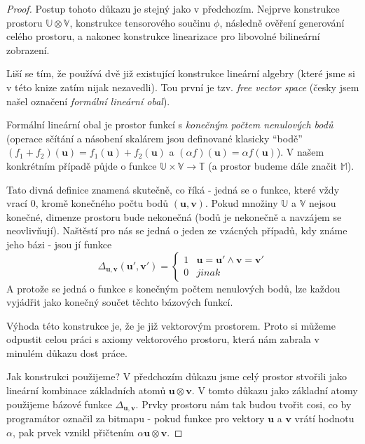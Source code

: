 \documentclass[a5paper,12pt]{amsbook}
\theoremstyle{definition}
\newcommand{\myvec}[1]{\bm{#1}}
\newcommand{\myspace}[1]{\mathbb{#1}}
\begin{document}
\begin{proof}
Postup tohoto důkazu je stejný jako v předchozím. Nejprve konstrukce prostoru
$\myspace{U}\otimes\myspace{V}$, konstrukce tensorového součinu $\phi$, následně
ověření generování celého prostoru, a nakonec konstrukce linearizace pro libovolné
bilineární zobrazení.

Liší se tím, že používá dvě již existující konstrukce lineární algebry (které jsme si
v této knize zatím nijak nezavedli). Tou první je tzv. \textit{free vector space} (česky
jsem našel označení \textit{formální lineární obal}).

Formální lineární obal je prostor funkcí s \textit{konečným počtem nenulových bodů} (operace
sčítání a násobení skalárem jsou definované klasicky ``bodě'' $(f_1 + f_2)(\myvec{u}) 
= f_1(\myvec{u}) + f_2(\myvec{u})$ a $(\alpha f)(\myvec{u}) = \alpha f(\myvec{u})$). V našem
konkrétním případě půjde o funkce $\myspace{U}\times\myspace{V}\rightarrow\myspace{T}$
(a prostor budeme dále značit $\myspace{M}$).

Tato divná definice znamená skutečně, co říká - jedná se o funkce, které vždy vrací 0, kromě
konečného počtu bodů $(\myvec{u}, \myvec{v})$. Pokud množiny $\myspace{U}$ a $\myspace{V}$
nejsou konečné, dimenze prostoru bude nekonečná (bodů je nekonečně a navzájem se neovlivňují).
Naštěstí pro nás se jedná o jeden ze vzácných případů, kdy známe jeho bázi - jsou jí funkce
\begin{equation*}
\Delta_{\myvec{u}, \myvec{v}}(\myvec{u'}, \myvec{v'}) =
\begin{cases}
1 & \myvec{u} = \myvec{u'} \wedge \myvec{v} = \myvec{v'} \\
0 & jinak
\end{cases}
\end{equation*}
A protože se jedná o funkce s konečným počtem nenulových bodů, lze každou vyjádřit jako
konečný součet těchto bázových funkcí.

Výhoda této konstrukce je, že je již vektorovým prostorem. Proto si můžeme odpustit
celou práci s axiomy vektorového prostoru, která nám zabrala v minulém důkazu dost práce.

Jak konstrukci použijeme? V předchozím důkazu jsme celý prostor stvořili
jako lineární kombinace základních atomů $\myvec{u}\otimes\myvec{v}$. V tomto důkazu
jako základní atomy použijeme bázové funkce $\Delta_{\myvec{u}, \myvec{v}}$. Prvky
prostoru nám tak budou tvořit cosi, co by programátor označil za bitmapu - pokud
funkce pro vektory $\myvec{u}$ a $\myvec{v}$ vrátí hodnotu $\alpha$, pak prvek
vznikl přičtením $\alpha \myvec{u}\otimes\myvec{v}$.


\end{proof}
\end{document}
